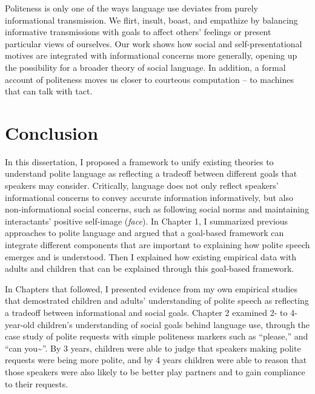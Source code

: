 \documentclass[oneside]{report}
\begin{document}
Politeness is only one of the ways language use deviates from purely
informational transmission. We flirt, insult, boast, and empathize by
balancing informative transmissions with goals to affect others'
feelings or present particular views of ourselves. Our work shows how
social and self-presentational motives are integrated with informational
concerns more generally, opening up the possibility for a broader theory
of social language. In addition, a formal account of politeness moves us
closer to courteous computation -- to machines that can talk with tact.

\chapter*{Conclusion}\label{conclusion}

In this dissertation, I proposed a framework to unify existing theories
to understand polite language as reflecting a tradeoff between different
goals that speakers may consider. Critically, language does not only
reflect speakers' informational concerns to convey accurate information
informatively, but also non-informational social concerns, such as
following social norms and maintaining interactants' positive self-image
(\emph{face}). In Chapter 1, I summarized previous approaches to polite
language and argued that a goal-based framework can integrate different
components that are important to explaining how polite speech emerges
and is understood. Then I explained how existing empirical data with
adults and children that can be explained through this goal-based
framework.

In Chapters that followed, I presented evidence from my own empirical
studies that demostrated children and adults' understanding of polite
speech as reflecting a tradeoff between informational and social goals.
Chapter 2 examined 2- to 4-year-old children's understanding of social
goals behind language use, through the case study of polite requests
with simple politeness markers such as ``please,'' and ``can
you\textasciitilde{}''. By 3 years, children were able to judge that
speakers making polite requests were being more polite, and by 4 years
children were able to reason that those speakers were also likely to be
better play partners and to gain compliance to their requests.
\end{document}
